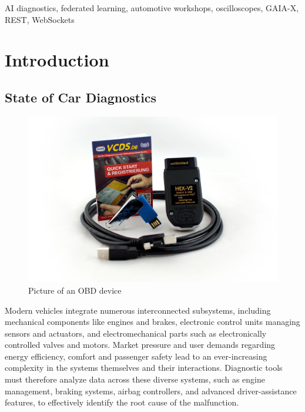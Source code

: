 \begin{IEEEkeywords}
AI diagnostics, federated learning, automotive workshops, oscilloscopes, GAIA-X, REST, WebSockets
\end{IEEEkeywords}

\section{Introduction}
\subsection{State of Car Diagnostics}
\begin{figure}[ht]
  \centering
  \includegraphics[width=0.95\linewidth]{figures/obd_device.jpg}
  \caption{Picture of an OBD device}
  \label{fig:obd}
\end{figure}
Modern vehicles integrate numerous interconnected subsystems, including mechanical components like engines and brakes, 
electronic control units managing sensors and actuators, and electromechanical parts such as electronically controlled valves and motors. 
Market pressure and user demands regarding energy efficiency, comfort and passenger safety lead to an ever-increasing complexity in the systems themselves and their interactions.
Diagnostic tools must therefore analyze data across these diverse systems, such as engine management, braking systems, airbag controllers, 
and advanced driver-assistance features, to effectively identify the root cause of the malfunction.

